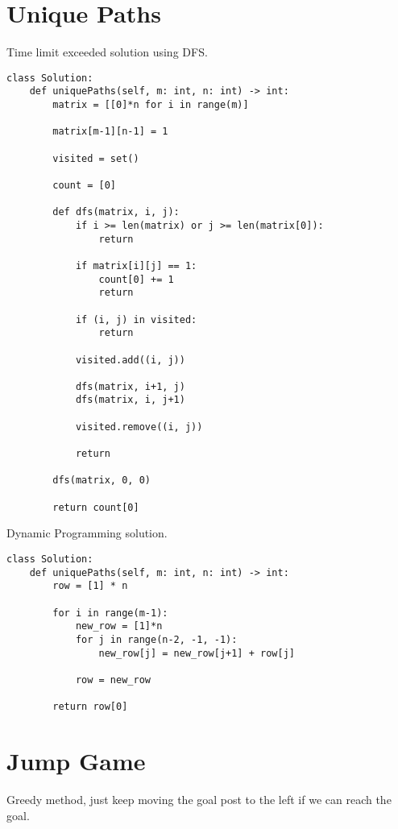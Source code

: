 \documentclass[24pt, a4]{article}
\begin{document}
\section{Unique Paths}


Time limit exceeded solution using DFS.
\begin{lstlisting}
class Solution:
    def uniquePaths(self, m: int, n: int) -> int:
        matrix = [[0]*n for i in range(m)]
        
        matrix[m-1][n-1] = 1
        
        visited = set()
        
        count = [0]
        
        def dfs(matrix, i, j):
            if i >= len(matrix) or j >= len(matrix[0]):
                return
            
            if matrix[i][j] == 1:
                count[0] += 1
                return
            
            if (i, j) in visited:
                return
            
            visited.add((i, j))
            
            dfs(matrix, i+1, j)
            dfs(matrix, i, j+1)
            
            visited.remove((i, j))
            
            return
        
        dfs(matrix, 0, 0)
        
        return count[0]
\end{lstlisting}

Dynamic Programming solution.

\begin{lstlisting}
class Solution:
    def uniquePaths(self, m: int, n: int) -> int:
        row = [1] * n
        
        for i in range(m-1):
            new_row = [1]*n
            for j in range(n-2, -1, -1):
                new_row[j] = new_row[j+1] + row[j]
            
            row = new_row
        
        return row[0]
\end{lstlisting}

\section{Jump Game}
Greedy method, just keep moving the goal post to the left if we can reach the goal.
\end{document}
